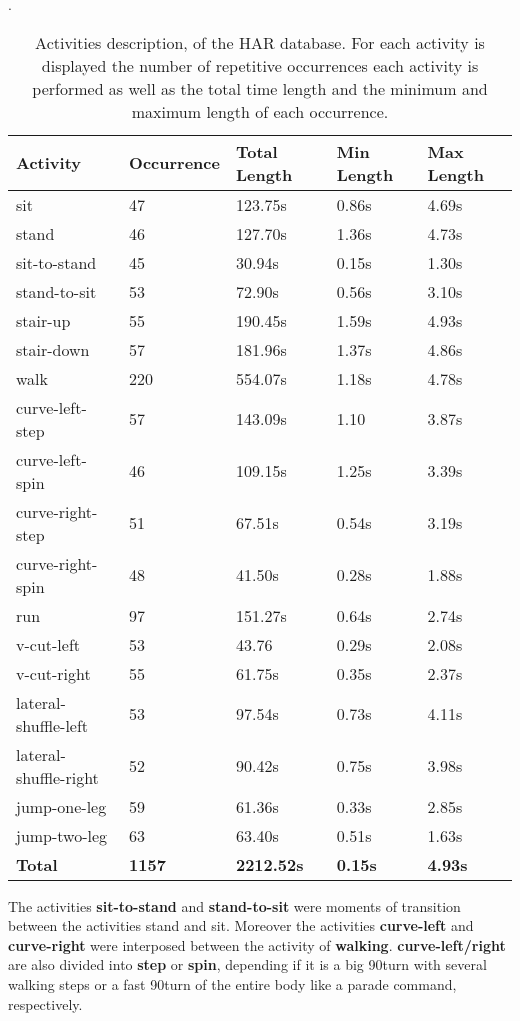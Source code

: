\begin{table}[ht]
	\caption[Activities description, of the \gls{HAR} database]{Activities description, of the \gls{HAR} database\cite{Liu2019}. For each activity is displayed the number of repetitive occurrences each activity is performed as well as the total time length and the minimum and maximum length of each occurrence.}.
	\label{tab:hui_actvs}
\centering
\begin{tabular}{lllll}
	\toprule
	\textbf{Activity} & 
	\textbf{Occurrence} &
	\textbf{Total Length} & 
	\textbf{Min Length} &
	\textbf{Max Length}\\
    \midrule
 sit & 47 & 123.75s & 0.86s & 4.69s\\
 stand & 46 & 127.70s & 1.36s & 4.73s \\
 sit-to-stand & 45 & 30.94s & 0.15s & 1.30s\\
 stand-to-sit & 53 & 72.90s & 0.56s & 3.10s\\
 stair-up & 55 & 190.45s & 1.59s & 4.93s\\
 stair-down & 57 & 181.96s & 1.37s & 4.86s\\
 walk & 220 & 554.07s & 1.18s & 4.78s\\
 curve-left-step & 57 & 143.09s & 1.10 & 3.87s\\
 curve-left-spin & 46 & 109.15s & 1.25s & 3.39s\\
 curve-right-step & 51 & 67.51s & 0.54s & 3.19s \\
 curve-right-spin & 48 & 41.50s & 0.28s & 1.88s \\
 run & 97 & 151.27s & 0.64s & 2.74s\\
 v-cut-left & 53 & 43.76 & 0.29s & 2.08s\\
 v-cut-right & 55 & 61.75s & 0.35s & 2.37s\\
 lateral-shuffle-left & 53 & 97.54s & 0.73s & 4.11s \\
 lateral-shuffle-right & 52 & 90.42s & 0.75s & 3.98s\\
 jump-one-leg & 59 & 61.36s & 0.33s & 2.85s \\
 jump-two-leg & 63 & 63.40s & 0.51s & 1.63s\\
 \hline
 \textbf{Total} & \textbf{1157} & \textbf{2212.52s} & \textbf{0.15s} & \textbf{4.93s}\\
\bottomrule
\end{tabular}
\end{table}

The activities \textbf{sit-to-stand} and \textbf{stand-to-sit} were moments of transition between the activities stand and sit. Moreover the activities \textbf{curve-left} and \textbf{curve-right} were interposed between the activity of \textbf{walking}. \textbf{curve-left/right} are also divided into \textbf{step} or \textbf{spin}, depending if it is a big 90\degree turn with several walking steps or a fast 90\degree turn of the entire body like a parade command, respectively.


